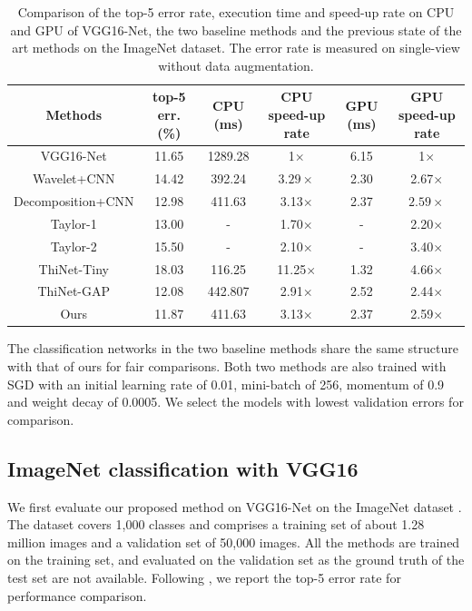\documentclass[letterpaper]{article} %
\begin{document}
\begin{table}[!t]
\centering
\begin{tabular}{c|c|c|c|c|c}
\hline
\centering  Methods  & top-5 err. (\%)& CPU (ms)  & CPU speed-up rate  & GPU (ms) & GPU speed-up rate\\
\hline
\hline
VGG16-Net   & 11.65  & 1289.28& 1$\times$ & 6.15&1$\times$  \\
\hline
Wavelet+CNN      &  14.42 & 392.24  & $3.29\times$  & 2.30  & 2.67$\times$  \\
Decomposition+CNN      &  12.98 & 411.63 & 3.13$\times$ & 2.37  & $2.59\times$\\
\hline
Taylor-1 & 13.00  & - & 1.70$\times$ & - & 2.20$\times$ \\
Taylor-2 & 15.50  & - & 2.10$\times$ & - & 3.40$\times$ \\
ThiNet-Tiny & 18.03  & 116.25  & 11.25$\times$ & 1.32 & 4.66$\times$ \\
ThiNet-GAP & 12.08  &442.807  & 2.91$\times$ &2.52 & 2.44$\times$\\
\hline
Ours   & 11.87  & 411.63 & 3.13$\times$ & 2.37  & 2.59$\times$ \\
\hline
\end{tabular}
\caption{Comparison of the top-5 error rate, execution time and speed-up rate on CPU and GPU of VGG16-Net, the two baseline methods and the previous state of the art methods on the ImageNet dataset. The error rate is measured on single-view without data augmentation.}
\label{table:imagenet_comparison}
\end{table}

The classification networks in the two baseline methods share the same structure with that of ours for fair comparisons. Both two methods are also trained with SGD with an initial learning rate of 0.01, mini-batch of 256, momentum of 0.9 and weight decay of 0.0005. We select the models with lowest validation errors for comparison.

\subsection{ImageNet classification with VGG16}
We first evaluate our proposed method on VGG16-Net on the ImageNet dataset \cite{russakovsky2015imagenet}. The dataset covers 1,000 classes and comprises a training set of about 1.28 million images and a validation set of 50,000 images. All the methods are trained on the training set, and evaluated on the validation set as the ground truth of the test set are not available. Following \cite{zhang2016accelerating}, we report the top-5 error rate for performance comparison.
\end{document}
